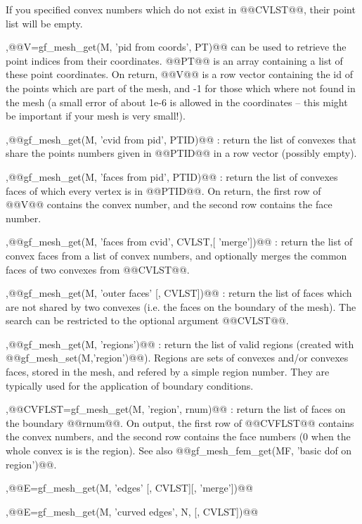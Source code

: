 \begin{cmddescription}
  If you specified convex numbers which do not exist in @@CVLST@@,
  their point list will be empty.
  
  \sep{@@V=gf\_mesh\_get(M, 'pid from coords', PT)@@} can be used to
  retrieve the point indices from their coordinates. @@PT@@ is an
  array containing a list of these point coordinates. On return, @@V@@
  is a row vector containing the id of the points which are part of
  the mesh, and -1 for those which where not found in the mesh (a
  small error of about 1e-6 is allowed in the coordinates -- this
  might be important if your mesh is very small!).
  
  \sep{@@gf\_mesh\_get(M, 'cvid from pid', PTID)@@} : return
  the list of convexes that share the points numbers given in
  @@PTID@@ in a row vector (possibly empty).

  \sep{@@gf\_mesh\_get(M, 'faces from pid', PTID)@@} :
  return the list of convexes faces of which every vertex is in @@PTID@@.
  On return, the first row of @@V@@ contains the convex number, and the
  second row contains the face number.

  \sep{@@gf_mesh_get(M, 'faces from cvid', CVLST,[ 'merge'])@@} :
  return the list of convex faces from a list of convex numbers, and
  optionally merges the common faces of two convexes from @@CVLST@@.

  \sep{@@gf\_mesh\_get(M, 'outer faces' [, CVLST])@@} :
  return the list of faces which are not shared by two convexes (i.e. the
  faces on the boundary of the mesh). The search can be restricted to the
  optional argument @@CVLST@@.
  
  \sep{@@gf\_mesh\_get(M, 'regions')@@} : 
  return the list of valid regions (created with
  @@gf_mesh_set(M,'region')@@). Regions are sets of convexes and/or
  convexes faces, stored in the mesh, and refered by a simple region
  number. They are typically used for the application of boundary
  conditions.

  \sep{@@CVFLST=gf\_mesh\_get(M, 'region', rnum)@@} : return the list of faces
  on the boundary @@rnum@@. On output, the first row of @@CVFLST@@
  contains the convex numbers, and the second row contains the face
  numbers (0 when the whole convex is is the region). See also
  @@gf\_mesh\_fem\_get(MF, 'basic dof on region')@@.

  \sep{@@E=gf\_mesh\_get(M, 'edges' [, CVLST][, 'merge'])@@}
  
  \sep{@@E=gf\_mesh\_get(M, 'curved edges', N, [, CVLST])@@}
  

\end{cmddescription}
